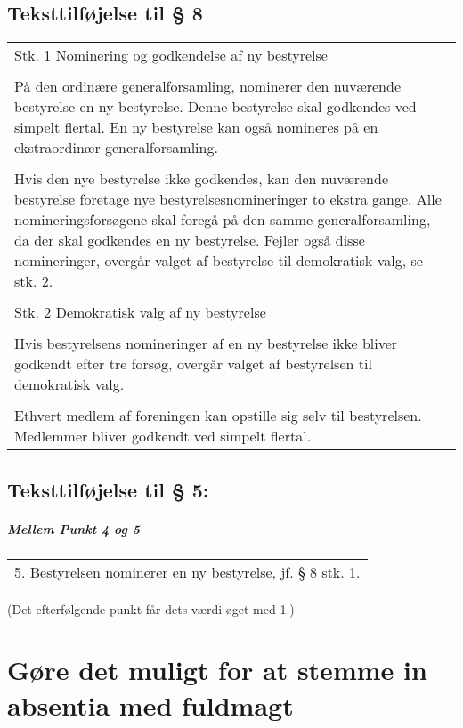 \documentclass[a4paper,11pt]{report}
\newenvironment{quotationb}%
{\begin{tabular}{|p{10cm}}}%
{\\\end{tabular}}
\begin{document}
\begin{appendices}
\section*{Teksttilføjelse til § 8}

\begin{quotationb}
Stk. 1 Nominering og godkendelse af ny bestyrelse\\
\\
På den ordinære generalforsamling, nominerer den nuværende bestyrelse en ny
bestyrelse.  Denne bestyrelse skal godkendes ved simpelt flertal.  En ny
bestyrelse kan også nomineres på en ekstraordinær generalforsamling.\\
\\
Hvis den nye bestyrelse ikke godkendes, kan den nuværende bestyrelse
foretage nye bestyrelsesnomineringer to ekstra gange.  Alle nomineringsforsøgene
skal foregå på den samme generalforsamling, da der skal godkendes en ny
bestyrelse.  Fejler også disse nomineringer, overgår valget af bestyrelse til
demokratisk valg, se stk. 2.\\
\\
Stk. 2 Demokratisk valg af ny bestyrelse\\
\\
Hvis bestyrelsens nomineringer af en ny bestyrelse ikke bliver godkendt efter
tre forsøg, overgår valget af bestyrelsen til demokratisk valg.\\
\\
Ethvert medlem af foreningen kan opstille sig selv til bestyrelsen.
Medlemmer bliver godkendt ved simpelt flertal.
\end{quotationb}

\section*{Teksttilføjelse til § 5:}

\paragraph{Mellem Punkt 4 og 5}

\begin{quotationb}
5. Bestyrelsen nominerer en ny bestyrelse, jf. § 8 stk. 1.
\end{quotationb}

\setlength{\parskip}{15pt}
(Det efterfølgende punkt får dets værdi øget med 1.)
\setlength{\parskip}{0pt}

\chapter{Gøre det muligt for at stemme in absentia med fuldmagt}
\label{app:change5}


\end{appendices}
\end{document}
